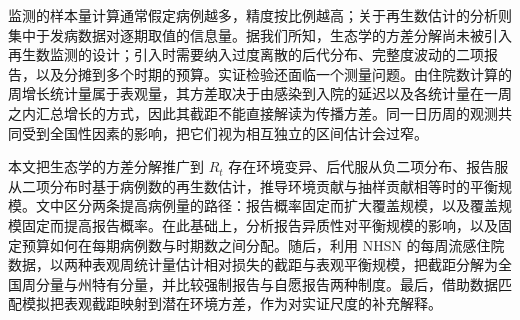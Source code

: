 监测的样本量计算通常假定病例越多，精度按比例越高\citep{cochran1977sampling}；关于再生数估计的分析则集中于发病数据对逐期取值的信息量\citep{parag2022quantifying, bhatt2023semi}。据我们所知，生态学的方差分解尚未被引入再生数监测的设计；引入时需要纳入过度离散的后代分布、完整度波动的二项报告，以及分摊到多个时期的预算。实证检验还面临一个测量问题。由住院数计算的周增长统计量属于表观量，其方差取决于由感染到入院的延迟以及各统计量在一周之内汇总增长的方式，因此其截距不能直接解读为传播方差。同一日历周的观测共同受到全国性因素的影响，把它们视为相互独立的区间估计会过窄\citep{cameron2011robust}。

本文把生态学的方差分解推广到 $R_t$ 存在环境变异、后代服从负二项分布、报告服从二项分布时基于病例数的再生数估计，推导环境贡献与抽样贡献相等时的平衡规模。文中区分两条提高病例量的路径：报告概率固定而扩大覆盖规模，以及覆盖规模固定而提高报告概率。在此基础上，分析报告异质性对平衡规模的影响，以及固定预算如何在每期病例数与时期数之间分配。随后，利用 NHSN 的每周流感住院数据，以两种表观周统计量估计相对损失的截距与表观平衡规模，把截距分解为全国周分量与州特有分量，并比较强制报告与自愿报告两种制度。最后，借助数据匹配模拟把表观截距映射到潜在环境方差，作为对实证尺度的补充解释。
